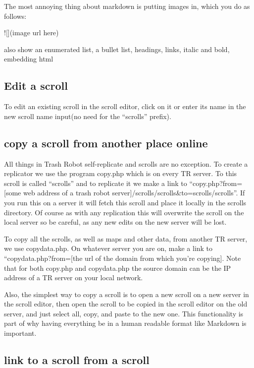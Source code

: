 The most annoying thing about markdown is putting images in, which you
do as follows:

![](image url here)

also show an enumerated list, a bullet list, headings, links, italic and bold, embedding html

\subsection{Edit a scroll}\label{edit-a-scroll}

To edit an existing scroll in the scroll editor, click on it or enter
its name in the new scroll name input(no need for the ``scrolls''
prefix).

\subsection{copy a scroll from another place
online}\label{copy-a-scroll-from-another-place-online}

All things in Trash Robot self-replicate and scrolls are no exception.
To create a replicator we use the program copy.php which is on every TR
server. To this scroll is called ``scrolls'' and to replicate it we make
a link to ``copy.php?from={[}some web address of a trash robot
server{]}/scrolls/scrolls\&to=scrolls/scrolls''. If you run this on a
server it will fetch this scroll and place it locally in the scrolls
directory. Of course as with any replication this will overwrite the
scroll on the local server so be careful, as any new edits on the new
server will be lost.

To copy all the scrolls, as well as maps and other data, from another TR
server, we use copydata.php. On whatever server you are on, make a link
to ``copydata.php?from={[}the url of the domain from which you're
copying{]}. Note that for both copy.php and copydata.php the source
domain can be the IP address of a TR server on your local network.

Also, the simplest way to copy a scroll is to open a new scroll on a new
server in the scroll editor, then open the scroll to be copied in the
scroll editor on the old server, and just select all, copy, and paste to
the new one. This functionality is part of why having everything be in a
human readable format like Markdown is important.

\subsection{link to a scroll from a
scroll}\label{link-to-a-scroll-from-a-scroll}

